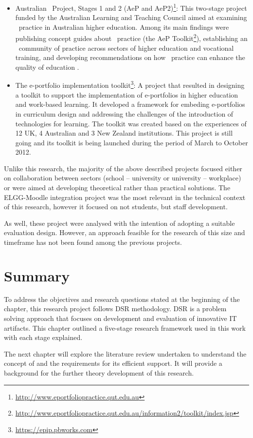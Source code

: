 \begin{itemize}
  \item Australian \ep~Project, Stages 1 and 2 (AeP and
  AeP2)\footnote{\url{http://www.eportfoliopractice.qut.edu.au}}: This  
  two-stage project funded by the Australian Learning and Teaching Council aimed
  at examining \ep~practice in Australian higher education. Among its main
  findings were publishing concept guides about \ep~practice (the AeP Toolkit\footnote{\url{http://www.eportfoliopractice.qut.edu.au/information2/toolkit/index.jsp}}),
  establishing an \ep~community of practice across sectors of higher education
  and vocational training, and developing recommendations on how \ep~practice
  can enhance the quality of education \citep{Hallam2008,Hallam2009}.
  
  \item The e-portfolio implementation
  toolkit\footnote{\url{https://epip.pbworks.com}}: A project that resulted in
  designing a toolkit to support the implementation of e-portfolios in higher
  education and work-based learning. It developed a framework for embeding
  e-portfolios in curriculum design and addressing the challenges of the
  introduction of technologies for learning. The toolkit was created based on
  the experiences of 12 UK, 4 Australian and 3 New Zealand institutions. This
  project is still going and its toolkit is being launched during the period of
  March to October 2012.
\end{itemize}

Unlike this research, the majority of the above described projects focused
either on collaboration between sectors (school -- university or university --
workplace) or were aimed at developing theoretical rather than practical
solutions. The ELGG-Moodle integration project was the most relevant in
the technical context of this research, however it focused on not students,
but staff development. 

As well, these project were analysed with the intention of adopting a suitable
evaluation design. However, an approach feasible for the research of this size
and timeframe has not been found among the previous projects.

\section{Summary}

To address the objectives and research questions stated at the beginning of the
chapter, this research project follows DSR methodology. DSR is a problem solving
approach that focuses on development and evaluation of innovative IT artifacts.
This chapter outlined a five-stage research framework used in this work with
each stage explained.

The next chapter will explore the literature review undertaken to understand the
concept of \LLLs and the requirements for its efficient support. It will provide
a background for the further theory development of this research.
